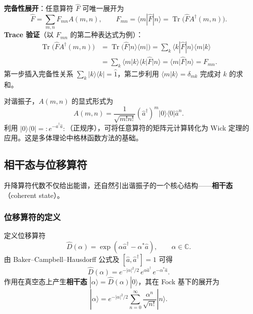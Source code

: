 \textbf{完备性展开}：任意算符 $\hat{F}$ 可唯一展开为
\begin{equation}
\boxed{\hat{F} = \sum_{m,n}F_{mn}A(m,n),
\qquad F_{mn}=\langle m|\hat{F}|n\rangle = \operatorname{Tr}\bigl(\hat{F}A^\dagger(m,n)\bigr).}
\end{equation}
\textbf{Trace 验证}（以 $F_{mn}$ 的第二种表达式为例）：
\begin{align*}
\operatorname{Tr}\bigl(\hat{F}A^\dagger(m,n)\bigr)
&= \operatorname{Tr}\bigl(\hat{F}|n\rangle\langle m|\bigr)
= \sum_k \langle k|\hat{F}|n\rangle\langle m|k\rangle \\
&= \sum_k \langle m|k\rangle\langle k|\hat{F}|n\rangle
= \langle m|\hat{F}|n\rangle = F_{mn}.
\end{align*}
第一步插入完备性关系 $\sum_k|k\rangle\langle k|=\hat{1}$，第二步利用 $\langle m|k\rangle=\delta_{mk}$ 完成对 $k$ 的求和。

\begin{insightbox}[投影算符与谐振子]
对谐振子，$A(m,n)$ 的显式形式为
\[
A(m,n) = \frac{1}{\sqrt{m!n!}}(\hat{a}^\dagger)^m|0\rangle\langle 0|\hat{a}^n.
\]
利用 $|0\rangle\langle 0| = :e^{-\hat{a}^\dagger\hat{a}}:$（正规序），可将任意算符的矩阵元计算转化为 Wick 定理的应用。这是多体理论中格林函数方法的基础。
\end{insightbox}

\subsection{相干态与位移算符}

升降算符代数不仅给出能谱，还自然引出谐振子的一个核心结构——\textbf{相干态}（coherent state）。

\subsubsection{位移算符的定义}

定义位移算符
\begin{equation}
\hat{D}(\alpha) = \exp(\alpha\hat{a}^\dagger - \alpha^*\hat{a}),
\qquad \alpha\in\mathbb{C}.
\end{equation}
由 Baker--Campbell--Hausdorff 公式及 $[\hat{a},\hat{a}^\dagger]=1$ 可得
\begin{equation}
\hat{D}(\alpha) = e^{-|\alpha|^2/2}\,e^{\alpha\hat{a}^\dagger}\,e^{-\alpha^*\hat{a}}.
\end{equation}
作用在真空态上产生\textbf{相干态} $|\alpha\rangle = \hat{D}(\alpha)|0\rangle$，其在 Fock 基下的展开为
\begin{equation}
\boxed{|\alpha\rangle = e^{-|\alpha|^2/2}\sum_{n=0}^{\infty}\frac{\alpha^n}{\sqrt{n!}}|n\rangle.}
\end{equation}

